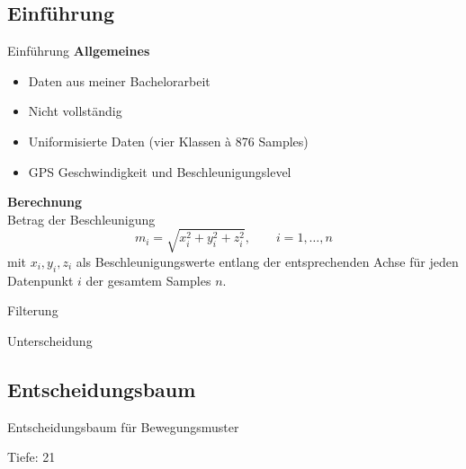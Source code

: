 \subsection{Einführung}
\begin{frame}{Einführung}
\textbf{Allgemeines}\\[1em]
\begin{itemize}[<+->]
    \item Daten aus meiner Bachelorarbeit
    \item Nicht vollständig
    \item Uniformisierte Daten (vier Klassen à 876 Samples)
    \item GPS Geschwindigkeit und Beschleunigungslevel
\end{itemize}

\vfill \pause

\textbf{Berechnung}\\[1em]
Betrag der Beschleunigung 
\begin{equation}
    m_i = \sqrt{x_i^2 + y_i^2 + z_i^2}, \qquad i = 1, \dots, n 
\end{equation}
mit $x_i, y_i, z_i$ als Beschleunigungswerte entlang der entsprechenden Achse für jeden Datenpunkt $i$ der gesamtem Samples $n$.

\end{frame}


\begin{frame}{Filterung}
    \centering 
    \setlength{} 
    \setlength{} 
     
\end{frame}



\begin{frame}{Unterscheidung}
    \centering 
    \setlength{} 
    \setlength{} 
     
\end{frame}



\subsection{Entscheidungsbaum}
\begin{frame}{Entscheidungsbaum für Bewegungsmuster}
    \centering 
    \setlength{} 
    \setlength{} 
     
    
    Tiefe: 21
\end{frame}


